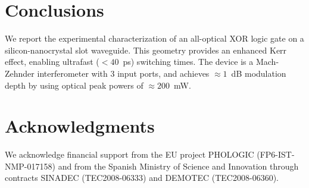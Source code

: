 \section{Conclusions}
We report the experimental characterization of an all-optical XOR logic gate on a silicon-nanocrystal slot waveguide. This geometry provides an enhanced Kerr effect, enabling ultrafast ($<40$~ps) switching times. The device is a Mach-Zehnder interferometer with 3 input ports, and achieves $\approx 1$~dB modulation depth by using optical peak powers of $\approx 200$~mW.

\section*{Acknowledgments}
We acknowledge financial support from the EU project PHOLOGIC (FP6-IST-NMP-017158) and from the Spanish Ministry of Science and Innovation through contracts SINADEC (TEC2008-06333) and DEMOTEC (TEC2008-06360).

